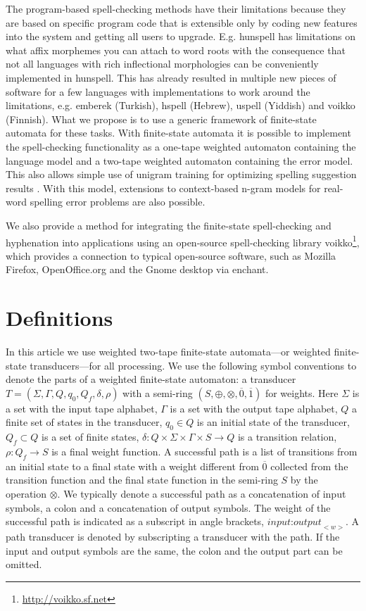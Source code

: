 \documentclass[postprint]{flammie}
\begin{document}
The program-based spell-checking methods have their limitations
because they are based on specific program code that is extensible
only by coding new features into the system and getting all users to
upgrade. E.g. hunspell has limitations on what affix morphemes you can
attach to word roots with the consequence that not all languages with
rich inflectional morphologies can be conveniently implemented in
hunspell. This has already resulted in multiple new pieces of software
for a few languages with implementations to work around the
limitations, e.g.  emberek (Turkish), hspell (Hebrew), uspell
(Yiddish) and voikko (Finnish). What we propose is to use a generic
framework of finite-state automata for these tasks. With finite-state
automata it is possible to implement the spell-checking functionality
as a one-tape weighted automaton containing the language model and a
two-tape weighted automaton containing the error model. This also
allows simple use of unigram training for optimizing spelling suggestion
results \cite{conf/lrec/Pirinen2010}. With this model, extensions to
context-based n-gram models for real-word spelling error problems
\cite{DBLP:conf/cicling/Wilcox-OHearnHB08} are also possible.

We also provide a method for integrating the finite-state spell-checking
and hyphenation into applications using an open-source spell-checking
library voikko\footnote{\url{http://voikko.sf.net}}, which provides a
connection to typical open-source software, such as Mozilla Firefox,
OpenOffice.org and the Gnome desktop via enchant.

\section{Definitions}
\label{sec:definitions}

In this article we use weighted two-tape finite-state automata---or
weighted finite-state transducers---for all processing. We use the
following symbol conventions to denote the parts of a weighted
finite-state automaton: a transducer $T = (\Sigma, \Gamma, Q, q_0,
Q_f, \delta, \rho)$ with a semi-ring $(S, \oplus, \otimes,
\overline{0}, \overline{1})$ for weights. Here $\Sigma$ is a set with
the input tape alphabet, $\Gamma$ is a set with the output tape
alphabet, $Q$ a finite set of states in the transducer, $q_0 \in Q$ is
an initial state of the transducer, $Q_f \subset Q$ is a set of finite
states, $\delta: Q \times \Sigma \times \Gamma \times S \rightarrow Q$
is a transition relation, $\rho: Q_f \rightarrow S$ is a final weight
function. A successful path is a list of transitions from an initial
state to a final state with a weight different from $\overline{0}$
collected from the transition function and the final state function in
the semi-ring $S$ by the operation $\otimes$. We typically denote a
successful path as a concatenation of input symbols, a colon and a
concatenation of output symbols. The weight of the successful path is
indicated as a subscript in angle brackets,
$\textit{input:output}_{<w>}$. A path transducer is denoted by
subscripting a transducer with the path.  If the input and output
symbols are the same, the colon and the output part can be omitted.
\end{document}
